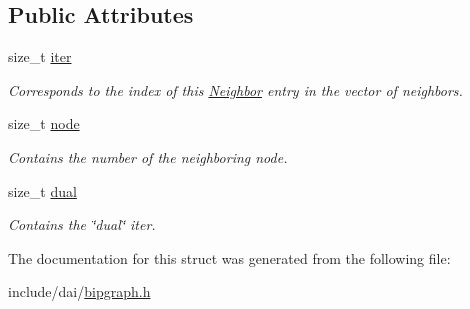 \subsection*{Public Attributes}
\begin{CompactItemize}
\item 
\hypertarget{structdai_1_1BipartiteGraph_1_1Neighbor_66412c1951bbf7023ee692b60af52979}{
size\_\-t \hyperlink{structdai_1_1BipartiteGraph_1_1Neighbor_66412c1951bbf7023ee692b60af52979}{iter}}
\label{structdai_1_1BipartiteGraph_1_1Neighbor_66412c1951bbf7023ee692b60af52979}

\begin{CompactList}\small\item\em Corresponds to the index of this \hyperlink{structdai_1_1BipartiteGraph_1_1Neighbor}{Neighbor} entry in the vector of neighbors. \item\end{CompactList}\item 
\hypertarget{structdai_1_1BipartiteGraph_1_1Neighbor_59a333d966c5662fa19aa08ca8fb9aba}{
size\_\-t \hyperlink{structdai_1_1BipartiteGraph_1_1Neighbor_59a333d966c5662fa19aa08ca8fb9aba}{node}}
\label{structdai_1_1BipartiteGraph_1_1Neighbor_59a333d966c5662fa19aa08ca8fb9aba}

\begin{CompactList}\small\item\em Contains the number of the neighboring node. \item\end{CompactList}\item 
\hypertarget{structdai_1_1BipartiteGraph_1_1Neighbor_4b63f7dff21e11d61518f1264c541bd8}{
size\_\-t \hyperlink{structdai_1_1BipartiteGraph_1_1Neighbor_4b63f7dff21e11d61518f1264c541bd8}{dual}}
\label{structdai_1_1BipartiteGraph_1_1Neighbor_4b63f7dff21e11d61518f1264c541bd8}

\begin{CompactList}\small\item\em Contains the \char`\"{}dual\char`\"{} iter. \item\end{CompactList}\end{CompactItemize}


The documentation for this struct was generated from the following file:\begin{CompactItemize}
\item 
include/dai/\hyperlink{bipgraph_8h}{bipgraph.h}\end{CompactItemize}
